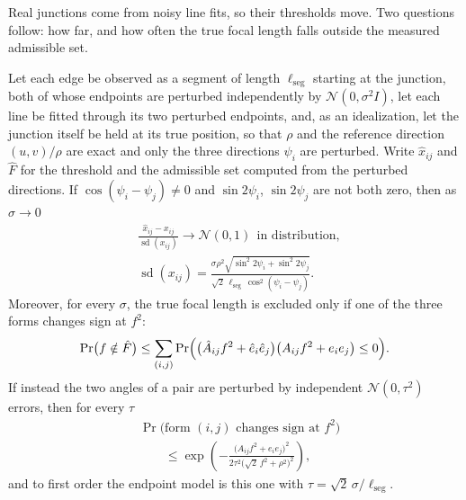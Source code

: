 Real junctions come from noisy line fits, so their thresholds move. Two questions follow: how far, and how often the true focal length falls outside the measured admissible set.

\begin{proposition}\label{prop:noise}
Let each edge be observed as a segment of length $\ell_{\mathrm{seg}}$ starting at the junction, both of whose endpoints are perturbed independently by $\mathcal N(0,\sigma^2I)$, let each line be fitted through its two perturbed endpoints, and, as an idealization, let the junction itself be held at its true position, so that $\rho$ and the reference direction $(u,v)/\rho$ are exact and only the three directions $\psi_i$ are perturbed. Write $\hat x_{ij}$ and $\hat F$ for the threshold and the admissible set computed from the perturbed directions. If $\cos(\psi_i-\psi_j)\neq0$ and $\sin2\psi_i$, $\sin2\psi_j$ are not both zero, then as $\sigma\to0$
\begin{equation}
\begin{aligned}
&\frac{\hat x_{ij}-x_{ij}}{\operatorname{sd}(x_{ij})}\longrightarrow\mathcal N(0,1)\ \ \text{in distribution},\\
&\operatorname{sd}(x_{ij})=\frac{\sigma\rho^2\sqrt{\sin^2 2\psi_i+\sin^2 2\psi_j}}{\sqrt2\,\ell_{\mathrm{seg}}\,\cos^2(\psi_i-\psi_j)} .
\end{aligned}
\label{eq:sd}
\end{equation}
Moreover, for every $\sigma$, the true focal length is excluded only if one of the three forms changes sign at $f^2$:
\begin{equation}
\Pr\bigl(f\notin\hat F\bigr)\le\sum_{(i,j)}\Pr\Bigl(\bigl(\hat A_{ij}f^2+\hat e_i\hat e_j\bigr)\bigl(A_{ij}f^2+e_ie_j\bigr)\le0\Bigr).
\label{eq:union}
\end{equation}
If instead the two angles of a pair are perturbed by independent $\mathcal N(0,\tau^2)$ errors, then for every $\tau$
\begin{equation}
\begin{aligned}
&\Pr\bigl(\text{form $(i,j)$ changes sign at $f^2$}\bigr)\\
&\qquad\le\exp\!\left(-\frac{\bigl(A_{ij}f^2+e_ie_j\bigr)^2}{2\tau^2\bigl(\sqrt2\,f^2+\rho^2\bigr)^2}\right),
\end{aligned}
\label{eq:rigorous}
\end{equation}
and to first order the endpoint model is this one with $\tau=\sqrt2\,\sigma/\ell_{\mathrm{seg}}$.
\end{proposition}
